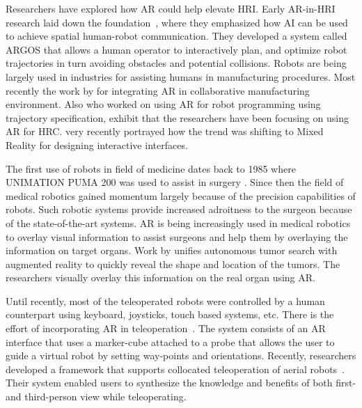 \documentclass{article}
\begin{document}
Researchers have explored how AR could help elevate HRI. 
Early AR-in-HRI research laid down the foundation~\cite{milgram1993applications}, where they emphasized how AI can be used to achieve spatial human-robot communication. 
They developed a system called ARGOS that allows a human operator to interactively plan, and optimize robot trajectories in turn avoiding obstacles and potential collisions. 
Robots are being largely used in industries for assisting humans in manufacturing procedures. Most recently the work by \cite{bagchi2018towards} for integrating AR in collaborative manufacturing environment. Also \cite{quintero2018robot} who worked on using AR for robot programming using trajectory specification, exhibit that the researchers have been focusing on using AR for HRC. \cite{chen2019interface} very recently portrayed how the trend was shifting to Mixed Reality for designing interactive interfaces. 
    
The first use of robots in field of medicine dates back to 1985 where UNIMATION PUMA 200 was used to assist in surgery \cite{1354}. Since then the field of medical robotics gained momentum largely because of the precision capabilities of robots. Such robotic systems provide increased adroitness to the surgeon because of the state-of-the-art systems. AR is being increasingly used in medical robotics to overlay visual information to assist surgeons and help them by overlaying the information on target organs. Work by \cite{zevallosreal}  unifies autonomous tumor search with augmented reality to quickly reveal the shape and location of the tumors. The researchers visually overlay this information on the real organ using AR.

Until recently, most of the teleoperated robots were controlled by a human counterpart using keyboard, joysticks, touch based systems, etc. 
There is the effort of incorporating AR in teleoperation~\cite{fang2012interactive}. 
The system consists of an AR interface that uses a marker-cube attached to a probe that allows the user to guide a virtual robot by setting way-points and orientations. 
Recently, researchers developed a framework that supports collocated teleoperation of aerial robots~\cite{hedayati2018improving}. 
Their system enabled users to synthesize the knowledge and benefits of both first- and third-person view while teleoperating. 
\end{document}
